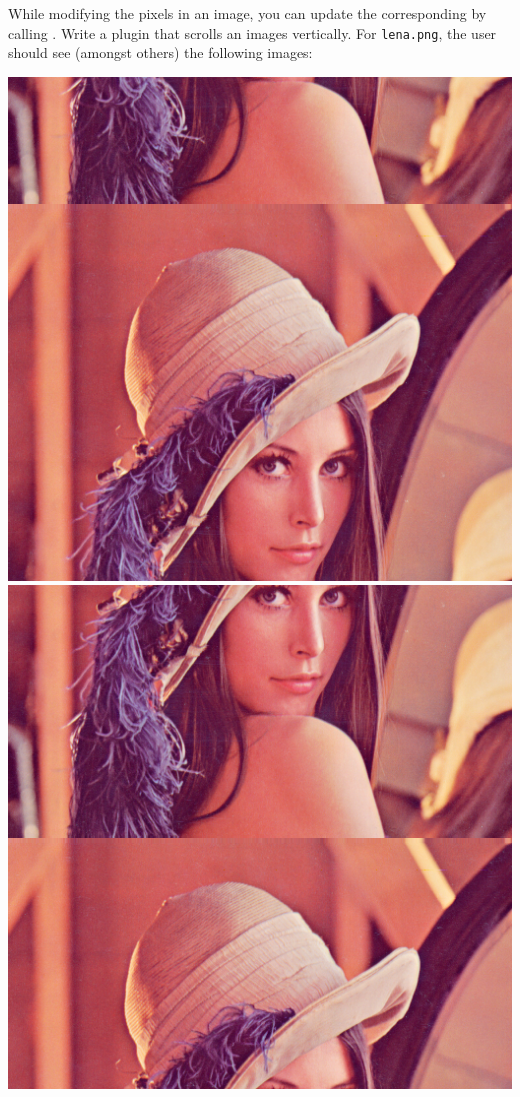 \documentclass{book}
\begin{document}
\begin{exercise}
While modifying the pixels in an image, you can update the corresponding  by calling . Write a plugin  that scrolls an images vertically. For \texttt{lena.png}, the user should see (amongst others) the following images:

\begin{center}
\includegraphics[scale=0.2]{lena-scrolled-1.png} 
\includegraphics[scale=0.2]{lena-scrolled-2.png}

\end{center}
\end{exercise}
\end{document}
